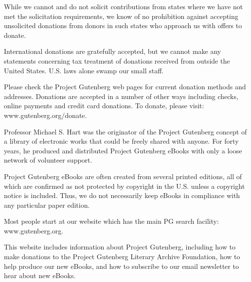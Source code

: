 \documentclass[12pt,openright]{book}
\begin{document}
While we cannot and do not solicit contributions from states where we have not met the solicitation requirements, we know of no prohibition against accepting unsolicited donations from donors in such states who approach us with offers to donate.

International donations are gratefully accepted, but we cannot make any statements concerning tax treatment of donations received from outside the United States. U.S. laws alone swamp our small staff.

Please check the Project Gutenberg web pages for current donation methods and addresses. Donations are accepted in a number of other ways including checks, online payments and credit card donations. To donate, please visit: www.gutenberg.org/donate.

Professor Michael S. Hart was the originator of the Project Gutenberg concept of a library of electronic works that could be freely shared with anyone. For forty years, he produced and distributed Project Gutenberg eBooks with only a loose network of volunteer support.

Project Gutenberg eBooks are often created from several printed editions, all of which are confirmed as not protected by copyright in the U.S. unless a copyright notice is included. Thus, we do not necessarily keep eBooks in compliance with any particular paper edition.

Most people start at our website which has the main PG search facility: www.gutenberg.org.

This website includes information about Project Gutenberg, including how to make donations to the Project Gutenberg Literary Archive Foundation, how to help produce our new eBooks, and how to subscribe to our email newsletter to hear about new eBooks.



\backmatter

\end{document}
